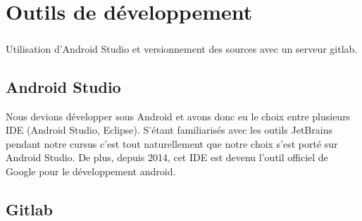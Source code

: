 \documentclass[a4paper,10pt]{report}
\begin{document}

\chapter{Outils de développement}
  \paragraph{}
  Utilisation d'Android Studio et versionnement des sources avec un serveur gitlab.
  \section{Android Studio}
  Nous devions développer sous Android et avons donc eu le choix entre plusieurs IDE (Android Studio, Eclipse). S'étant familiarisés avec les outils JetBrains pendant notre cursus c'est tout naturellement que notre choix s'est porté sur Android Studio. De plus, depuis 2014, cet IDE est devenu l'outil officiel de Google pour le développement android.
  \section{Gitlab}
\end{document}

